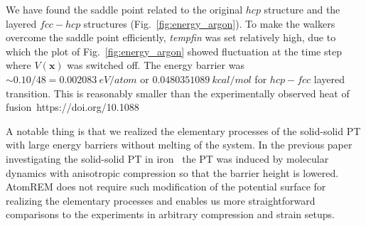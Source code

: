 \documentclass[preprint,12pt]{elsarticle}
\begin{document}



We have found the saddle point related to the original $hcp$ structure and the layered $fcc-hcp$ structures (Fig.~\ref{fig:energy_argon}). To make the walkers overcome the saddle point efficiently, {\it tempfin} was set relatively high, due to which the plot of Fig.~\ref{fig:energy_argon} showed fluctuation at the time step where $V({\bm x})$ was switched off. The energy barrier was $\sim 0.10/48=0.002083~eV/atom$ or $0.0480351089~kcal/mol$ for $hcp-fcc$ layered transition. This is reasonably smaller than the experimentally observed heat of fusion~https://doi.org/10.1088%

A notable thing is that we realized the elementary processes of the solid-solid PT with large energy barriers without melting of the system. In the previous paper investigating the solid-solid PT in iron~\cite{Iron_bcc_hcp_fcc} the PT was induced by molecular dynamics with anisotropic compression so that the barrier height is lowered. AtomREM does not require such modification of the potential surface for realizing the elementary processes and enables us more straightforward comparisons to the experiments in arbitrary compression and strain setups.

\end{document}
